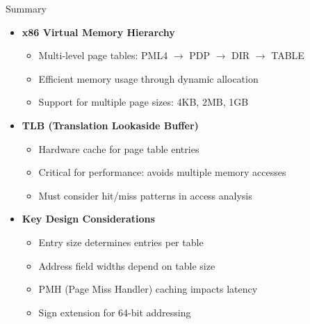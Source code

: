 \documentclass[aspectratio=169,12pt]{beamer}
\begin{document}
\begin{frame}{Summary}
\begin{itemize}
    \item \textbf{x86 Virtual Memory Hierarchy}
    \begin{itemize}
        \item Multi-level page tables: PML4 $\rightarrow$ PDP $\rightarrow$ DIR $\rightarrow$ TABLE
        \item Efficient memory usage through dynamic allocation
        \item Support for multiple page sizes: 4KB, 2MB, 1GB
    \end{itemize}

    \vspace{0.5em}
    \item \textbf{TLB (Translation Lookaside Buffer)}
    \begin{itemize}
        \item Hardware cache for page table entries
        \item Critical for performance: avoids multiple memory accesses
        \item Must consider hit/miss patterns in access analysis
    \end{itemize}

    \vspace{0.5em}
    \item \textbf{Key Design Considerations}
    \begin{itemize}
        \item Entry size determines entries per table
        \item Address field widths depend on table size
        \item PMH (Page Miss Handler) caching impacts latency
        \item Sign extension for 64-bit addressing
    \end{itemize}
\end{itemize}
\end{frame}
\end{document}
